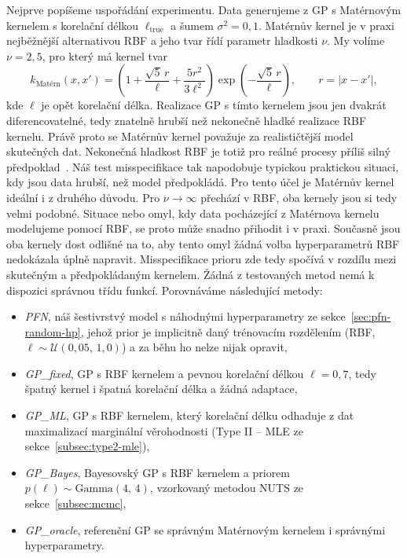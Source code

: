 Nejprve popíšeme uspořádání experimentu.
Data generujeme z GP s Matérnovým kernelem s korelační délkou $\ell_{\text{true}}$ a šumem $\sigma^2 = 0{,}1$.
Matérnův kernel je v praxi nejběžnější alternativou RBF a jeho tvar řídí parametr hladkosti $\nu$.
My volíme $\nu = 2{,}5$, pro který má kernel tvar
$$k_{\text{Matérn}}(x, x') = \left(1 + \frac{\sqrt{5}\,r}{\ell} + \frac{5 r^2}{3 \ell^2}\right) \exp\!\left(-\frac{\sqrt{5}\,r}{\ell}\right), \qquad r = |x - x'|,$$
kde $\ell$ je opět korelační délka.
Realizace GP s tímto kernelem jsou jen dvakrát diferencovatelné, tedy znatelně hrubší než nekonečně hladké realizace RBF kernelu.
Právě proto se Matérnův kernel považuje za realističtější model skutečných dat.
Nekonečná hladkost RBF je totiž pro reálné procesy příliš silný předpoklad~\cite{rasmussen2006}.
Náš test misspecifikace tak napodobuje typickou praktickou situaci, kdy jsou data hrubší, než model předpokládá.
Pro tento účel je Matérnův kernel ideální i z druhého důvodu.
Pro $\nu \to \infty$ přechází v RBF, oba kernely jsou si tedy velmi podobné.
Situace nebo omyl, kdy data pocházející z Matérnova kernelu modelujeme pomocí RBF, se proto může snadno přihodit i v praxi.
Současně jsou oba kernely dost odlišné na to, aby tento omyl žádná volba hyperparametrů RBF nedokázala úplně napravit.
Misspecifikace prioru zde tedy spočívá v rozdílu mezi skutečným a předpokládaným kernelem.
Žádná z testovaných metod nemá k dispozici správnou třídu funkcí.
Porovnáváme následující metody:
\begin{itemize}
    \item \emph{PFN}, náš šestivrstvý model s náhodnými hyperparametry ze sekce~\ref{sec:pfn-random-hp}, jehož prior je implicitně daný trénovacím rozdělením (RBF, $\ell \sim \mathcal{U}(0{,}05,\, 1{,}0)$) a za běhu ho nelze nijak opravit,
    \item \emph{GP\_fixed}, GP s RBF kernelem a pevnou korelační délkou $\ell = 0{,}7$, tedy špatný kernel i špatná korelační délka a žádná adaptace,
    \item \emph{GP\_ML}, GP s RBF kernelem, který korelační délku odhaduje z dat maximalizací marginální věrohodnosti (Type II – MLE ze sekce~\ref{subsec:type2-mle}),
    \item \emph{GP\_Bayes}, Bayesovský GP s RBF kernelem a priorem $p(\ell) \sim \text{Gamma}(4,\, 4)$, vzorkovaný metodou NUTS ze sekce~\ref{subsec:mcmc},
    \item \emph{GP\_oracle}, referenční GP se správným Matérnovým kernelem i správnými hyperparametry.
\end{itemize}
